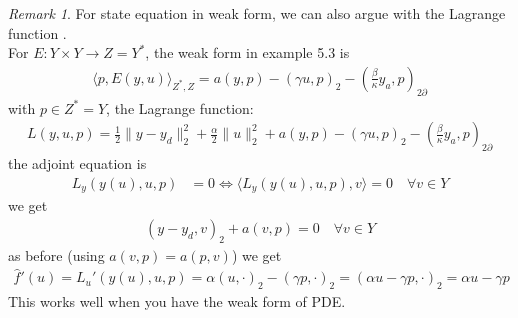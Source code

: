 \documentclass[a4paper,11pt,fleqn]{book}
\theoremstyle{definition}
\theoremstyle{remark}
\newtheorem*{remark}{Remark}
\begin{document}
\begin{remark}
For state equation in weak form, we can also argue with the Lagrange function	.\\
For $E : Y \times Y \rightarrow Z = Y^*$, the weak form in example 5.3 is 
\begin{align*}
	\langle p, E(y, u) \rangle_{Z^*, Z} = a (y, p) - (\gamma u , p)_2 - (\frac{\beta}{\kappa}y_a, p)_{2 \partial}
\end{align*}
with $p \in Z^* = Y$, the Lagrange function:
\begin{align*}
	L(y, u, p) = \frac{1}{2}\|y - y_d\|^2_2 + \frac{\alpha}{2} \|u\|^2_2 + a(y, p) - (\gamma u, p)_2 - (\frac{\beta}{\kappa}y_a, p)_{2 \partial}
\end{align*}
the adjoint equation is 
\begin{align*}
	L_y(y(u), u, p) &= 0 \Leftrightarrow \langle L_y(y(u), u, p), v \rangle = 0 \quad \forall v \in Y
\end{align*}
we get
\begin{align*}
	(y - y_d, v)_2 + a(v, p) = 0 \quad \forall v \in Y
\end{align*}
as before (using $a(v, p) = a(p, v)$) we get
\begin{align*}
	\hat{f}'(u) = L_u'(y(u), u, p) = \alpha(u, \cdot)_2 - (\gamma p, \cdot)_2 = (\alpha u - \gamma p, \cdot)_2 = \alpha u - \gamma p
\end{align*}
This works well when you have the weak form of PDE. 
\end{remark}
\quad\\
\quad\\
\end{document}
